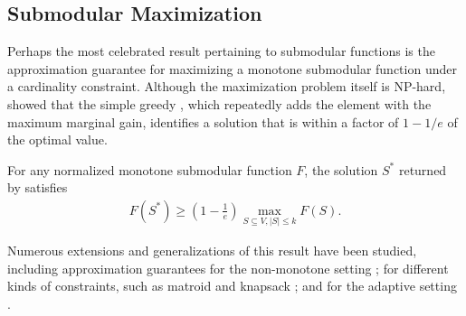 \subsection{Submodular Maximization}
Perhaps the most celebrated result pertaining to submodular functions is the approximation guarantee for maximizing a monotone submodular function under a cardinality constraint.
Although the maximization problem itself is NP-hard, \cite{nemhauser78} showed that the simple greedy , which repeatedly adds the element with the maximum marginal gain, identifies a solution that is within a factor of $1 - 1/e$ of the optimal value.
\begin{theorem}
For any normalized monotone submodular function $F$, the solution $S^*$ returned by  satisfies
\begin{align*}
F(S^*) \geq \left(1 - \frac{1}{e}\right) \max_{S \subseteq V, |S| \leq k} F(S).
\end{align*}
\end{theorem}


Numerous extensions and generalizations of this result have been studied, including approximation guarantees for the non-monotone setting \citep{feige11,buchbinder14}; for different kinds of constraints, such as matroid \citep{lee09,calinescu11} and knapsack \citep{chekuri11}; and for the adaptive setting \citep{golovin11,gotovos15}.


